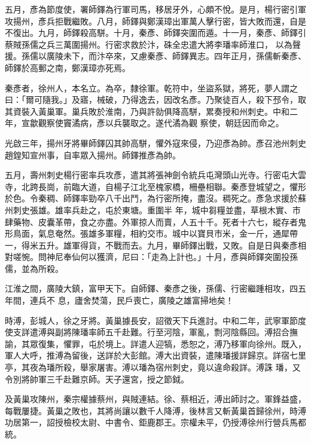 \begin{pinyinscope}
 五月，彥為節度使，署師鐸為行軍司馬，移居牙外，心頗不悅。是月，楊行密引軍攻揚州，彥兵拒戰繼敗。八月，師鐸與鄭漢璋出軍萬人擊行密，皆大敗而還，自是不復出。九月，師鐸殺高駢。十月，秦彥、師鐸突圍而遁。十一月，秦彥、師鐸引蔡賊孫儒之兵三萬圍揚州。行密求救於汴，硃全忠遣大將李璠率師淮口，
 以為聲援。孫儒以廣陵未下，而汴卒來，又慮秦彥、師鐸異志。四年正月，孫儒斬秦彥、師鐸於高郵之南，鄭漢璋亦死焉。



 秦彥者，徐州人，本名立。為卒，隸徐軍。乾符中，坐盜系獄，將死，夢人謂之曰：「爾可隨我。」及寤，械破，乃得逸去，因改名彥。乃聚徒百人，殺下邳令，取其資裝入黃巢軍。巢兵敗於淮南，乃與許勍俱降高駢，累奏授和州刺史。中和二年，宣歙觀察使竇潏病，彥以兵襲取之。遂代潏為觀
 察使，朝廷因而命之。



 光啟三年，揚州牙將畢師鐸囚其帥高駢，懼外寇來侵，乃迎彥為帥。彥召池州刺史趙鍠知宣州事，自率眾入揚州。師鐸推彥為帥。



 五月，壽州刺史楊行密率兵攻彥，遣其將張神劍令統兵屯灣頭山光寺。行密屯大雲寺，北跨長崗，前臨大道，自楊子江北至槐家橋，柵壘相聯。秦彥登城望之，懼形於色。令秦稠、師鐸率勁卒八千出鬥，為行密所掩，盡沒。稠死之。彥急求援於蘇州刺史張雄。雄率兵赴之，屯於東塘。重圍半
 年，城中芻糧並盡，草根木實、市肆藥物、皮囊革帶，食之亦盡。外軍掠人而賣，人五十千。死者十六七，縱存者鬼形鳥面，氣息奄然。張雄多軍糧，相約交市。城中以寶貝市米，金一斤，通犀帶一，得米五升。雄軍得貨，不戰而去。九月，畢師鐸出戰，又敗。自是日與秦彥相對嗟惋。問神尼奉仙何以獲濟，尼曰：「走為上計也。」十月，彥與師鐸突圍投孫儒，並為所殺。



 江淮之間，廣陵大鎮，富甲天下。自師鐸、秦彥之後，孫儒、行密繼踵相攻，四五年間，連兵不
 息，廬舍焚蕩，民戶喪亡，廣陵之雄富掃地矣！



 時溥，彭城人，徐之牙將。黃巢據長安，詔徵天下兵進討。中和二年，武寧軍節度使支詳遣溥與副將陳璠率師五千赴難。行至河陰，軍亂，剽河陰縣回。溥招合撫諭，其眾復集，懼罪，屯於境上。詳遣人迎犒，悉恕之，溥乃移軍向徐州。既入，軍人大呼，推溥為留後，送詳於大彭館。溥大出資裝，遣陳璠援詳歸京。詳宿七里亭，其夜為璠所殺，舉家屠害。溥以璠為宿州刺史，竟以違命殺詳。溥誅
 璠，又令別將帥軍三千赴難京師。天子還宮，授之節鉞。



 及黃巢攻陳州，秦宗權據蔡州，與賊連結。徐、蔡相近，溥出師討之。軍鋒益盛，每戰屢捷。黃巢之敗也，其將尚讓以數千人降溥，後林言又斬黃巢首歸徐州，時溥功居第一，詔授檢校太尉、中書令、鉅鹿郡王。宗權未平，仍授溥徐州行營兵馬都統。




\end{pinyinscope}
